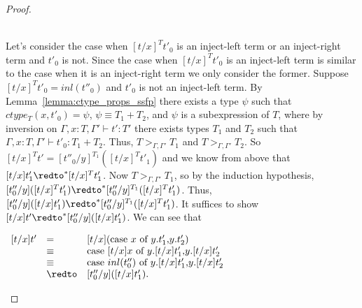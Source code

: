 \begin{proof}
\begin{itemize}
    \ \\
    Let's consider the case when $[t/x]^T t'_0$ is an inject-left term or an inject-right term and 
    $t'_0$ is not.  Since the case when $[t/x]^T t'_0$ is an inject-left term is similar to the case when
    it is an inject-right term we only consider the former.  Suppose $[t/x]^T t'_0 = inl(t''_0)$ and 
    $t'_0$ is not an inject-left term.  By Lemma~\ref{lemma:ctype_props_ssfp} there exists a type
    $\psi$ such that $ctype_T(x,t'_0) = \psi$, $\psi \equiv T_1+T_2$, and $\psi$ is a subexpression
    of $T$, where by inversion on $\Gamma,x:T,\Gamma' \vdash t':T'$ there exists types $T_1$ and
    $T_2$ such that $\Gamma,x:T,\Gamma' \vdash t'_0:T_1+T_2$.  Thus, $T >_{\Gamma,\Gamma'} T_1$
    and $T >_{\Gamma,\Gamma'} T_2$.  So $[t/x]^T t' = [t''_0/y]^{T_1} ([t/x]^{T} t'_1)$ and we know from above
    that $[t/x]t'_1 \redto^* [t/x]^{T} t'_1$.  Now $T >_{\Gamma,\Gamma'} T_1$, so by the induction
    hypothesis, $[t''_0/y]([t/x]^{T} t'_1) \redto^* [t''_0/y]^{T_1}([t/x]^T t'_1)$.  Thus,
    $[t''_0/y]([t/x] t'_1) \redto^* [t''_0/y]^{T_1}([t/x]^T t'_1)$.  It suffices to show 
    $ [t/x]t' \redto^* [t''_0/y]([t/x] t'_1)$.  We can see that 
    \begin{center}
      \begin{math}
        \begin{array}{lll}
          [t/x]t' & = & [t/x](\ccon{x}{y}{t'_1}{t'_2})\\
          & \equiv & \ccon{[t/x]x}{y}{[t/x]t'_1}{[t/x]t'_2}\\
          & \equiv & \ccon{inl(t''_0)}{y}{[t/x]t'_1}{[t/x]t'_2}\\
          & \redto & [t''_0/y]([t/x]t'_1).
        \end{array}
      \end{math}
    \end{center}
    

\end{itemize}
\end{proof}

